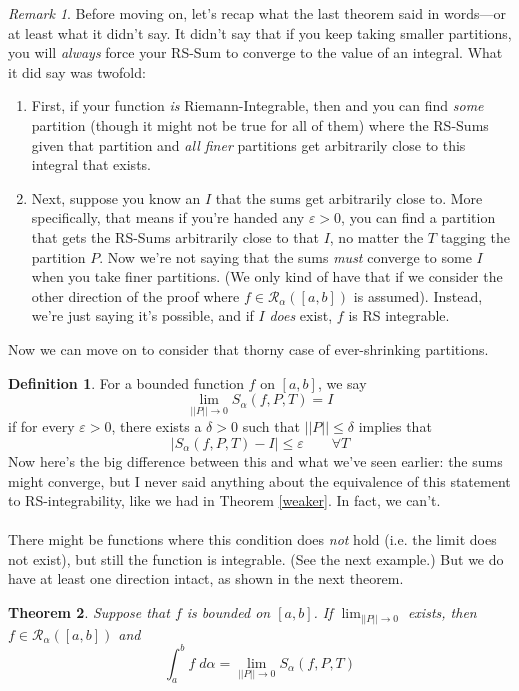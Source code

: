 \documentclass[12pt]{article}
\theoremstyle{plain}
\newtheorem{thm}{Theorem}[subsection]
\theoremstyle{definition}
\newtheorem{defn}[thm]{Definition}
\theoremstyle{remark}
\newtheorem*{rmk}{Remark}
\begin{document}
\begin{rmk}
Before moving on, let's recap what the last theorem said in words---or at least what it didn't say.  It didn't say that if you keep taking smaller partitions, you will \emph{always} force your RS-Sum to converge to the value of an integral.  What it did say was twofold:
\begin{enumerate}
    \item First, if your function \emph{is} Riemann-Integrable, then and you can find \emph{some} partition (though it might not be true for all of them) where the RS-Sums given that partition and \emph{all finer} partitions get arbitrarily close to this integral that exists.
    \item Next, suppose you know an $I$ that the sums get arbitrarily close to.  More specifically, that means if you're handed any $\varepsilon>0$, you can find a partition that gets the RS-Sums arbitrarily close to that $I$, no matter the $T$ tagging the partition $P$. Now we're not saying that the sums \emph{must} converge to some $I$ when you take finer partitions. (We only kind of have that if we consider the other direction of the proof where $f\in\mathscr{R}_\alpha([a,b])$ is assumed). Instead, we're just saying it's possible, and if $I$ \emph{does} exist, $f$ is RS integrable.
\end{enumerate}
Now we can move on to consider that thorny case of ever-shrinking partitions.
\end{rmk}
\begin{defn}
\label{strongest}
For a bounded function $f$ on $[a,b]$, we say 
    \[ \lim_{||P||\rightarrow 0} S_\alpha(f,P,T) = I \]
if for every $\varepsilon>0$, there exists a $\delta>0$ such that $||P||\leq\delta$ implies that
    \[ |S_\alpha(f,P,T) - I | \leq \varepsilon \qquad \forall T \]
    Now here's the big difference between this and what we've seen earlier: the sums might converge, but I never said anything about the equivalence of this statement to RS-integrability, like we had in Theorem \ref{weaker}.  In fact, we can't.
\\
\\
There might be functions where this condition does \emph{not} hold (i.e. the limit does not exist), but still the function is integrable. (See the next example.) But we do have at least one direction intact, as shown in the next theorem.
\end{defn}
\begin{thm}
\label{oneway}
Suppose that $f$ is bounded on $[a,b]$. If $\lim_{||P||\rightarrow 0}$ exists, then $f\in\mathscr{R}_\alpha([a,b])$ and
    \[ \int^b_a f\;d\alpha = \lim_{||P||\rightarrow 0} 
    S_\alpha(f,P,T) \]
\end{thm}
\end{document}
